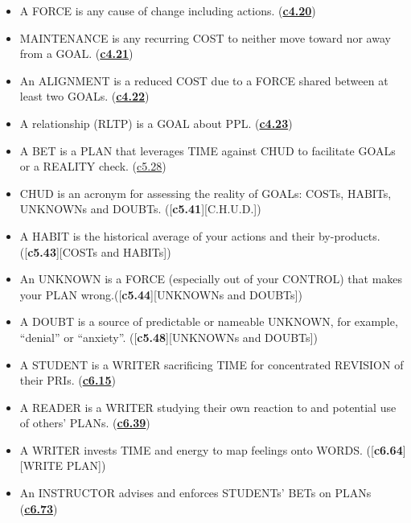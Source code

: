 \documentclass[
]{book}
\begin{document}
\begin{itemize}
\item
  A FORCE is any cause of change including actions. (\hyperref[work]{\textbf{c4.20}})\\
\item
  MAINTENANCE is any recurring COST to neither move toward nor away from a GOAL. (\hyperref[work]{\textbf{c4.21}})\\
\item
  An ALIGNMENT is a reduced COST due to a FORCE shared between at least two GOALs. (\hyperref[work]{\textbf{c4.22}})\\
\item
  A relationship (RLTP) is a GOAL about PPL. (\hyperref[work]{\textbf{c4.23}})\\
\item
  A BET is a PLAN that leverages TIME against CHUD to facilitate GOALs or a REALITY check. (\hyperref[bet]{c5.28})\\
\item
  CHUD is an acronym for assessing the reality of GOALs: COSTs, HABITs, UNKNOWNs and DOUBTs. ({[}\textbf{c5.41}{]}{[}C.H.U.D.{]})\\
\item
  A HABIT is the historical average of your actions and their by-products.({[}\textbf{c5.43}{]}{[}COSTs and HABITs{]})\\
\item
  An UNKNOWN is a FORCE (especially out of your CONTROL) that makes your PLAN wrong.({[}\textbf{c5.44}{]}{[}UNKNOWNs and DOUBTs{]})\\
\item
  A DOUBT is a source of predictable or nameable UNKNOWN, for example, ``denial'' or ``anxiety''. ({[}\textbf{c5.48}{]}{[}UNKNOWNs and DOUBTs{]})\\
\item
  A STUDENT is a WRITER sacrificing TIME for concentrated REVISION of their PRIs. (\hyperref[student]{\textbf{c6.15}})\\
\item
  A READER is a WRITER studying their own reaction to and potential use of others' PLANs. (\hyperref[read]{\textbf{c6.39}})\\
\item
  A WRITER invests TIME and energy to map feelings onto WORDS. ({[}\textbf{c6.64}{]}{[}WRITE PLAN{]})\\
\item
  An INSTRUCTOR advises and enforces STUDENTs' BETs on PLANs (\hyperref[instructor]{\textbf{c6.73}})\\

\end{itemize}
\end{document}
